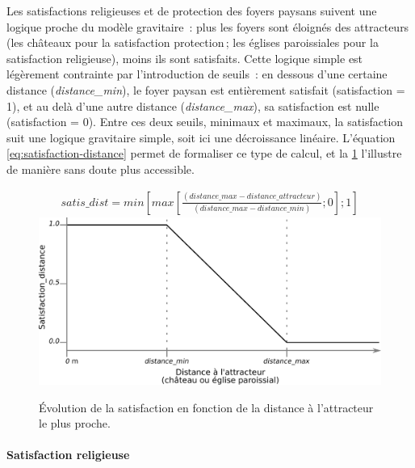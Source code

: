 Les satisfactions religieuses et de protection des foyers paysans suivent une logique proche du modèle gravitaire : plus les foyers sont éloignés des \og attracteurs\fg{} (les châteaux pour la satisfaction protection ; les églises paroissiales pour la satisfaction religieuse), moins ils sont satisfaits.
Cette logique simple est légèrement contrainte par l'introduction de seuils : en dessous d'une certaine distance (\textit{distance\_min}), le foyer paysan est entièrement satisfait (satisfaction = 1), et au delà d'une autre distance (\textit{distance\_max}), sa satisfaction est nulle (satisfaction = 0).
Entre ces deux seuils, minimaux et maximaux, la satisfaction suit une logique gravitaire simple, soit ici une décroissance linéaire.
L'équation \ref{eq:satisfaction-distance} permet de formaliser ce type de calcul, et la \cref{fig:satisfaction-distance} l'illustre de manière sans doute plus accessible.

\begin{figure}[H]
	\centering
	\begin{equation}\label{eq:satisfaction-distance}
	\begin{gathered}
	satis\_dist = min  \left \lbrack max \left \lbrack \frac{(distance\_max - distance\_attracteur)}{(distance\_max -distance\_min)}; 0 \right \rbrack ; 1 \right \rbrack
	\end{gathered}
	\end{equation}
	\includegraphics[width=.8\linewidth]{img/satisfaction_distance.pdf}
	\caption{Évolution de la satisfaction en fonction de la distance à l'attracteur le plus proche.}
	\label{fig:satisfaction-distance}
\end{figure}

\paragraph{Satisfaction religieuse}
		
